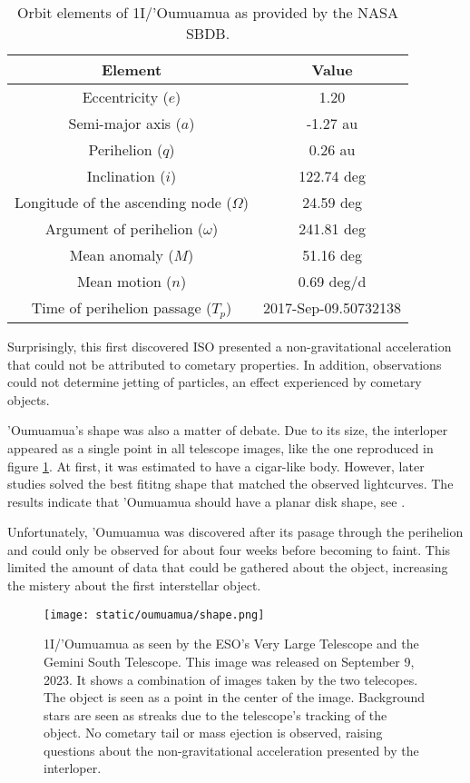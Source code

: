 \begin{table}[H]
  \centering
  \begin{tabular}{|c|c|}
    \hline
    Element & Value \\
    \hline
    Eccentricity ($e$) & 1.20 \\
    Semi-major axis ($a$) & -1.27 au \\
    Perihelion ($q$) & 0.26 au \\
    Inclination ($i$) & 122.74 deg \\
    Longitude of the ascending node ($\Omega$) & 24.59 deg \\
    Argument of perihelion ($\omega$) & 241.81 deg \\
    Mean anomaly ($M$) & 51.16 deg \\
    Mean motion ($n$) & 0.69 deg/d \\
    Time of perihelion passage ($T_p$) & 2017-Sep-09.50732138 \\
    \hline
  \end{tabular}
  \caption{Orbit elements of 1I/'Oumuamua as provided by the NASA SBDB.}
  \label{tab:oumuamua_elements}
\end{table}

Surprisingly, this first discovered ISO presented a non-gravitational
acceleration that could not be attributed to cometary properties. In addition,
observations could not determine jetting of particles, an effect experienced by
cometary objects.

'Oumuamua's shape was also a matter of debate. Due to its size, the interloper
appeared as a single point in all telescope images, like the one reproduced in
figure \ref{fig:oumuamua_shape}. At first, it was estimated to have a cigar-like
body. However, later studies solved the best fititng shape that matched the
observed lightcurves. The results indicate that 'Oumuamua should have a planar
disk shape, see \cite{seligman2022}.

Unfortunately, 'Oumuamua was discovered after its pasage through the perihelion
and could only be observed for about four weeks before becoming to faint. This
limited the amount of data that could be gathered about the object, increasing
the mistery about the first interstellar object.

\begin{figure}[H]
  \centering
  \texttt{[image: static/oumuamua/shape.png]}
\caption['Oumuamua as seen by the ESO's Very Large Telescope and the Gemini South Telescope]{
  1I/'Oumuamua as seen by the ESO's Very Large Telescope and the Gemini South Telescope. This image was
  released on September 9, 2023. It shows a combination of images taken by the two
  telecopes. The object is seen as a point in the center of the image. Background
  stars are seen as streaks due to the telescope's tracking of the object. No
  cometary tail or mass ejection is observed, raising questions about the non-gravitational
  acceleration presented by the interloper.
  }
  \label{fig:oumuamua_shape}
\end{figure}

